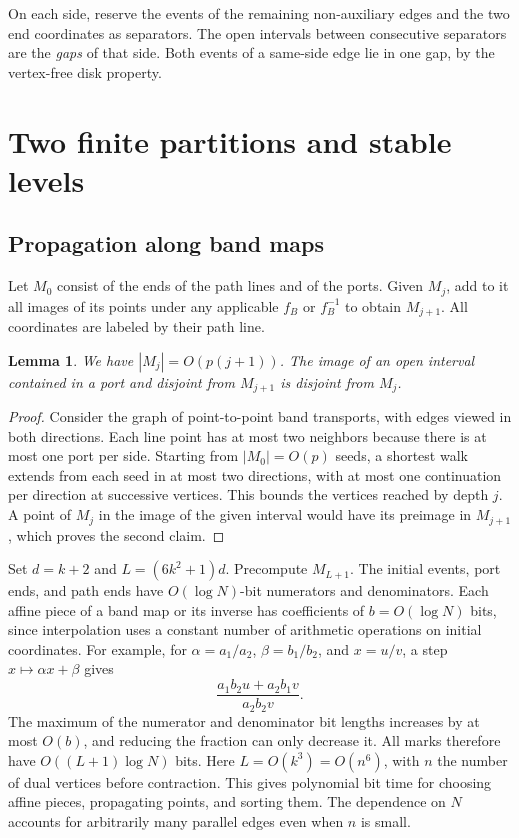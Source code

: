 \documentclass[10pt,letterpaper]{article}
\newtheorem{lemma}{Lemma}
\begin{document}
On each side, reserve the events of the remaining non-auxiliary edges and the two end coordinates as separators. The open intervals between consecutive separators are the \emph{gaps} of that side. Both events of a same-side edge lie in one gap, by the vertex-free disk property.

\section{Two finite partitions and stable levels}
\subsection{Propagation along band maps}
Let \(M_0\) consist of the ends of the path lines and of the ports. Given \(M_j\), add to it all images of its points under any applicable \(f_B\) or \(f_B^{-1}\) to obtain \(M_{j+1}\). All coordinates are labeled by their path line.

\begin{lemma}\label{lem:bandmarks}
We have \(|M_j|=O(p(j+1))\). The image of an open interval contained in a port and disjoint from \(M_{j+1}\) is disjoint from \(M_j\).
\end{lemma}
\begin{proof}
Consider the graph of point-to-point band transports, with edges viewed in both directions. Each line point has at most two neighbors because there is at most one port per side. Starting from \(|M_0|=O(p)\) seeds, a shortest walk extends from each seed in at most two directions, with at most one continuation per direction at successive vertices. This bounds the vertices reached by depth \(j\). A point of \(M_j\) in the image of the given interval would have its preimage in \(M_{j+1}\), which proves the second claim.
\end{proof}

Set \(d=k+2\) and \(L=(6k^2+1)d\). Precompute \(M_{L+1}\). The initial events, port ends, and path ends have \(O(\log N)\)-bit numerators and denominators. Each affine piece of a band map or its inverse has coefficients of \(b=O(\log N)\) bits, since interpolation uses a constant number of arithmetic operations on initial coordinates. For example, for \(\alpha=a_1/a_2\), \(\beta=b_1/b_2\), and \(x=u/v\), a step \(x\mapsto\alpha x+\beta\) gives
\[
              \frac{a_1 b_2 u+a_2 b_1 v}{a_2 b_2 v}.
\]
The maximum of the numerator and denominator bit lengths increases by at most \(O(b)\), and reducing the fraction can only decrease it. All marks therefore have \(O((L+1)\log N)\) bits. Here \(L=O(k^3)=O(n^6)\), with \(n\) the number of dual vertices before contraction. This gives polynomial bit time for choosing affine pieces, propagating points, and sorting them. The dependence on \(N\) accounts for arbitrarily many parallel edges even when \(n\) is small.
\end{document}
